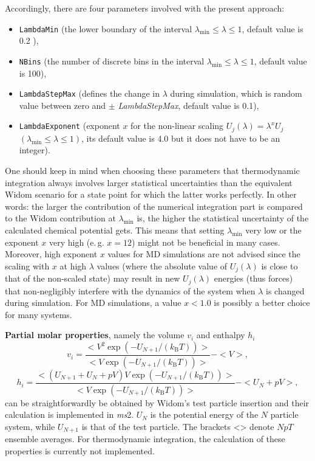 Accordingly, there are four parameters involved with the present approach:
\begin{itemize}
	\item \texttt{LambdaMin} (the lower boundary of the interval $\lambda_\text{min} \leq \lambda \leq 1$, default value is 0.2 ),
  \item \texttt{NBins} (the number of discrete bins in the interval $\lambda_\text{min} \leq \lambda \leq 1$, default value is 100),
  \item \texttt{LambdaStepMax} (defines the change in $\lambda$ during simulation, which is random value between zero and $\pm$ \textit{LambdaStepMax}, default value is 0.1),
  \item \texttt{LambdaExponent} (exponent $x$ for the non-linear scaling $U_j(\lambda)=\lambda^x U_j$ $(\lambda_\text{min} \leq \lambda \leq 1)$, its default value is 4.0 but it does not have to be an integer).
\end{itemize}
One should keep in mind when choosing these parameters that thermodynamic integration always involves larger statistical uncertainties than the equivalent Widom scenario for a state point for which the latter works perfectly. In other words: the larger the contribution of the numerical integration part is compared to the Widom contribution at $\lambda_\text{min}$ is, the higher the statistical uncertainty of the calculated chemical potential gets. This means that setting $\lambda_\text{min}$ very low or the exponent $x$ very high (e.\,g. $x=12$) might not be beneficial in many cases. Moreover, high exponent $x$ values for MD simulations are not advised since the scaling with $x$ at high $\lambda$ values (where the absolute value of $U_j(\lambda)$ is close to that of the non-scaled state) may result in new $U_j(\lambda)$ energies (thus forces) that non-negligibly interfere with the dynamics of the system when $\lambda$ is changed during simulation. For MD simulations, a value $x<1.0$ is possibly a better choice for many systems.

\textbf{Partial molar properties}, namely the volume $v_i$ and enthalpy $h_i$
\begin{equation}
v_i=\frac{<V^2 \exp(-U_{N+1}/(k_\text{B}T))>}{<V \exp(-U_{N+1}/(k_\text{B}T)) >}-<V>,
\end{equation}
\begin{equation}
h_i=\frac{<(U_{N+1}+U_N+pV) V \exp(-U_{N+1}/(k_\text{B}T))>}{<V \exp(-U_{N+1}/(k_\text{B}T)) >}-<U_N+pV>,
\end{equation}
can be straightforwardly be obtained by Widom's test particle insertion \parencite{Sindzingre_1987} and their calculation is implemented in \textit{ms}2. $U_N$ is the potential energy of the $N$ particle system, while $U_{N+1}$ is that of the test particle. The brackets <> denote $NpT$ ensemble averages. For thermodynamic integration, the calculation of these properties is currently not implemented.

